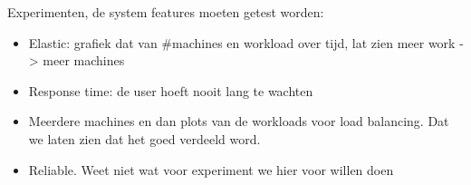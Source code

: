 Experimenten, de system features moeten getest worden:

\begin{itemize}
	\item Elastic: grafiek dat van \#machines en workload over tijd, lat zien meer work -> meer machines
	\item Response time: de user hoeft nooit lang te wachten
	\item Meerdere machines en dan plots van de workloads voor load balancing. Dat we laten zien dat het goed verdeeld word.
	\item Reliable. Weet niet wat voor experiment we hier voor willen doen
\end{itemize}
